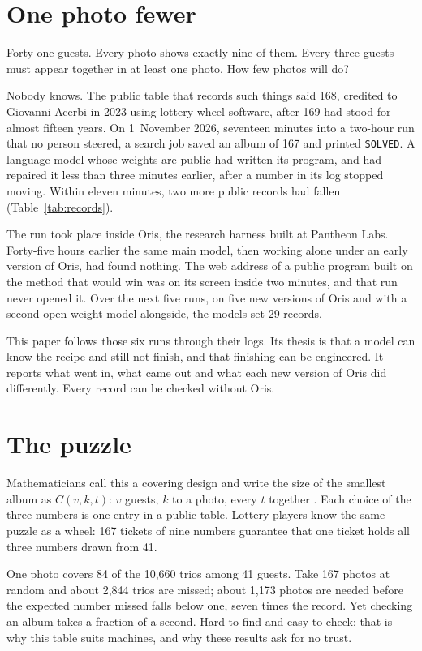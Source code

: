 \documentclass[11pt,letterpaper]{article}
\begin{document}
\section{One photo fewer}

\noindent Forty-one guests. Every photo shows exactly nine of them. Every three guests must appear together in at least one photo. How few photos will do?

Nobody knows. The public table that records such things said 168, credited to Giovanni Acerbi in 2023 using lottery-wheel software, after 169 had stood for almost fifteen years. On 1~November 2026, seventeen minutes into a two-hour run that no person steered, a search job saved an album of 167 and printed \texttt{SOLVED}. A language model whose weights are public had written its program, and had repaired it less than three minutes earlier, after a number in its log stopped moving. Within eleven minutes, two more public records had fallen (Table~\ref{tab:records}).

The run took place inside Oris, the research harness built at Pantheon Labs. Forty-five hours earlier the same main model, then working alone under an early version of Oris, had found nothing. The web address of a public program built on the method that would win was on its screen inside two minutes, and that run never opened it. Over the next five runs, on five new versions of Oris and with a second open-weight model alongside, the models set 29 records.

This paper follows those six runs through their logs. Its thesis is that a model can know the recipe and still not finish, and that finishing can be engineered. It reports what went in, what came out and what each new version of Oris did differently. Every record can be checked without Oris.

\section{The puzzle}

Mathematicians call this a covering design and write the size of the smallest album as $C(v,k,t)$: $v$ guests, $k$ to a photo, every $t$ together \cite{gkp}. Each choice of the three numbers is one entry in a public table. Lottery players know the same puzzle as a wheel: 167 tickets of nine numbers guarantee that one ticket holds all three numbers drawn from 41.

One photo covers 84 of the 10,660 trios among 41 guests. Take 167 photos at random and about 2,844 trios are missed; about 1,173 photos are needed before the expected number missed falls below one, seven times the record. Yet checking an album takes a fraction of a second. Hard to find and easy to check: that is why this table suits machines, and why these results ask for no trust.
\end{document}
